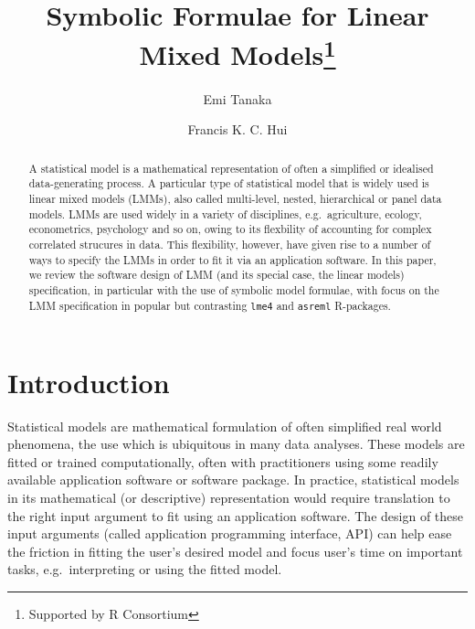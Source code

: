 \documentclass[runningheads]{llncs}
\title{Symbolic Formulae for Linear Mixed Models\thanks{Supported by R Consortium}}
\author{Emi Tanaka\inst{1} \and Francis K. C. Hui\inst{2}}
\institute{The University of Sydney, Camperdown NSW 2008, Australia\\\email{\href{mailto:dr.emi.tanaka@gmail.com}{\nolinkurl{dr.emi.tanaka@gmail.com}}}\\ \and Australian National University, Acton ACT 2601, Australia\\\email{\href{mailto:francis.hui@anu.edu.au}{\nolinkurl{francis.hui@anu.edu.au}}}\\}
\begin{document}
%
\maketitle              %
%
\begin{abstract}
A statistical model is a mathematical representation of often a simplified or idealised data-generating process. A particular type of statistical model that is widely used is linear mixed models (LMMs), also called multi-level, nested, hierarchical or panel data models. LMMs are used widely in a variety of disciplines, e.g.~agriculture, ecology, econometrics, psychology and so on, owing to its flexbility of accounting for complex correlated strucures in data. This flexibility, however, have given rise to a number of ways to specify the LMMs in order to fit it via an application software. In this paper, we review the software design of LMM (and its special case, the linear models) specification, in particular with the use of symbolic model formulae, with focus on the LMM specification in popular but contrasting \texttt{lme4} and \texttt{asreml} R-packages.
\end{abstract}

\hypertarget{introduction}{%
\section{Introduction}\label{introduction}}

Statistical models are mathematical formulation of often simplified real world phenomena, the use which is ubiquitous in many data analyses. These models are fitted or trained computationally, often with practitioners using some readily available application software or software package. In practice, statistical models in its mathematical (or descriptive) representation would require translation to the right input argument to fit using an application software. The design of these input arguments (called application programming interface, API) can help ease the friction in fitting the user's desired model and focus user's time on important tasks, e.g.~interpreting or using the fitted model.
\end{document}
